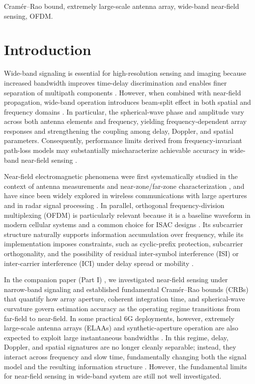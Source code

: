 \documentclass[9pt,final,journal,twocolumn]{IEEEtran}
\begin{document}
\begin{IEEEkeywords}
Cramér–Rao bound, extremely large-scale antenna array,  wide-band near-field sensing, OFDM. 
\end{IEEEkeywords}

\IEEEpeerreviewmaketitle

\section{Introduction}
Wide-band signaling is essential for high-resolution sensing and imaging because increased bandwidth improves time-delay discrimination and enables finer separation of multipath components \cite{weiss1984fundamental,yu2019wideband}. However, when combined with near-field propagation, wide-band operation introduces beam-split effect in both spatial and frequency domains \cite{cui2024near,elbir2024curse,vakalis2020fourier}. 
In particular, the spherical-wave phase and amplitude vary across both antenna elements and frequency, yielding frequency-dependent array responses and strengthening the coupling among delay, Doppler, and spatial parameters. Consequently, performance limits derived from frequency-invariant path-loss models may substantially mischaracterize achievable accuracy in wide-band near-field sensing \cite{wei2025crb}.

Near-field electromagnetic phenomena were first systematically studied in the context of antenna measurements and near-zone/far-zone characterization \cite{yaghjian1986overview}, and have since been widely explored in wireless communications with large apertures \cite{liu2023near-field} and in radar signal processing \cite{chen2002maximum}. In parallel, orthogonal frequency-division multiplexing (OFDM) is particularly relevant because it is a baseline waveform in modern cellular systems and a common choice for ISAC designs \cite{wan2024OFDM}. Its subcarrier structure naturally supports information accumulation over frequency, while its implementation imposes constraints, such as cyclic-prefix protection, subcarrier orthogonality, and the possibility of residual inter-symbol interference (ISI) or inter-carrier interference (ICI) under delay spread or mobility \cite{keskin2021limited}.

In the companion paper (Part I) \cite{wei2025PartI}, we investigated near-field sensing under narrow-band signaling and established fundamental Cramér–Rao bounds (CRBs) \cite{esmaeilbeig2022cramer,dokhanchi2019mmWave,lv2022co} that quantify how array aperture, coherent integration time, and spherical-wave curvature govern estimation accuracy as the operating regime transitions from far-field to near-field. In some practical 6G deployments, however, extremely large-scale antenna arrays (ELAAs) and synthetic-aperture operation are also expected to exploit large instantaneous bandwidths \cite{wei2023multi-IRS,wei2024RIS,hodge2023index}. In this regime, delay, Doppler, and spatial signatures are no longer cleanly separable; instead, they interact across frequency and slow time, fundamentally changing both the signal model and the resulting information structure \cite{wang2025perofrmance,wei2025PartI}. However, the fundamental limits for near-field sensing in wide-band system are still not well investigated.
\end{document}
